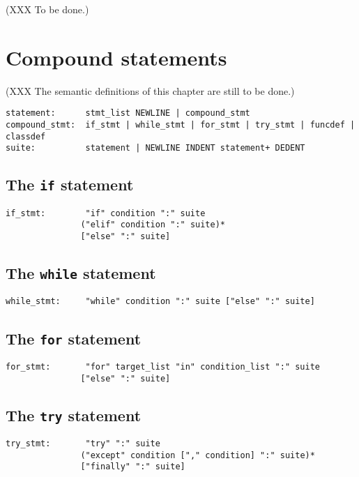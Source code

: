 (XXX To be done.)

\chapter{Compound statements}

(XXX The semantic definitions of this chapter are still to be done.)

\begin{verbatim}
statement:      stmt_list NEWLINE | compound_stmt
compound_stmt:  if_stmt | while_stmt | for_stmt | try_stmt | funcdef | classdef
suite:          statement | NEWLINE INDENT statement+ DEDENT
\end{verbatim}

\section{The {\tt if} statement}

\begin{verbatim}
if_stmt:        "if" condition ":" suite
               ("elif" condition ":" suite)*
               ["else" ":" suite]
\end{verbatim}

\section{The {\tt while} statement}

\begin{verbatim}
while_stmt:     "while" condition ":" suite ["else" ":" suite]
\end{verbatim}

\section{The {\tt for} statement}

\begin{verbatim}
for_stmt:       "for" target_list "in" condition_list ":" suite
               ["else" ":" suite]
\end{verbatim}

\section{The {\tt try} statement}

\begin{verbatim}
try_stmt:       "try" ":" suite
               ("except" condition ["," condition] ":" suite)*
               ["finally" ":" suite]
\end{verbatim}

